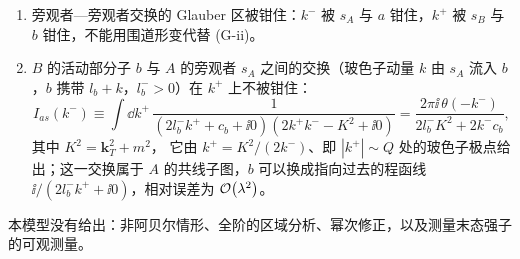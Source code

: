 \begin{proposition}
\begin{enumerate}[label=(G-\roman*),leftmargin=3em,itemsep=1pt,topsep=2pt]
\item 旁观者—旁观者交换的 Glauber 区被钳住：$k^-$ 被 $s_A$ 与 $a$ 钳住，$k^+$ 被 $s_B$ 与 $b$ 钳住，不能用围道形变代替 (G-ii)。
\item $B$ 的活动部分子 $b$ 与 $A$ 的旁观者 $s_A$ 之间的交换（玻色子动量 $k$ 由 $s_A$ 流入 $b$，$b$ 携带 $l_b+k$，$l_b^->0$）在 $k^+$ 上不被钳住：
\begin{equation}\label{eq:dy-Ias}
I_{as}(k^-)\equiv\int\dd k^+\,\frac{1}{(2l_b^-k^++c_b+\ii0)(2k^+k^--K^2+\ii0)}=\frac{2\pi\ii\,\theta(-k^-)}{2l_b^-K^2+2k^-c_b},
\end{equation}
其中 $K^2=\mathbf k_T^2+m^2$，
它由 $k^+=K^2/(2k^-)$、即 $|k^+|\sim Q$ 处的玻色子极点给出；这一交换属于 $A$ 的共线子图，$b$ 可以换成指向过去的程函线 $\ii/(2l_b^-k^++\ii0)$，相对误差为 $\mathcal{O}\!\left(\lambda^2\right)$。
\end{enumerate}
本模型没有给出：非阿贝尔情形、全阶的区域分析、幂次修正，以及测量末态强子的可观测量。
\end{proposition}

